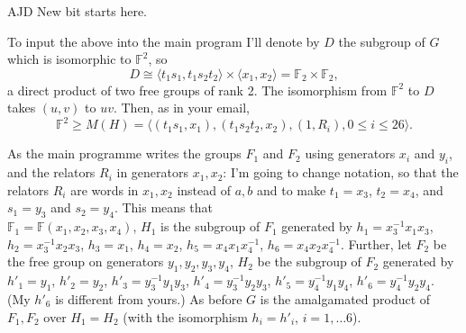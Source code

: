 \documentclass[a4paper,12pt]{article}
\numberwithin{equation}{section}
\numberwithin{figure}{section}
\newcommand{\FF}{\ensuremath{\mathbb{F}}}
\newcommand{\la}{\langle}
\newcommand{\ra}{\rangle}
\newenvironment{ajd1}{\noindent\color{red} AJD }{}
\newcommand{\ajd}[1]{\begin{ajd1} #1 \end{ajd1}}
\begin{document}
\ajd{New bit starts here.\\} 

To input the above into the main program I'll denote by $D$ 
the subgroup of $G$ which is isomorphic to  
$\FF^2$, so 
\[D\cong \la t_1s_1,t_1s_2t_2\ra\times \la x_1,x_2\ra=\FF_2\times \FF_2,\]
a direct product of two free groups of rank 2. The isomorphism from
$\FF^2$ to $D$ takes $(u,v)$ to $uv$. Then, as in your email, 
\[\FF^2\ge M(H)=\la (t_1s_1,x_1), (t_1s_2t_2,x_2), (1,R_i), 0\le i \le 26\ra.\]


As the main programme writes the groups $F_1$ and $F_2$ using generators 
$x_i$ and $y_i$, and the relators $R_i$ in generators $x_1,x_2$: 
 I'm going to change notation, so that 
the relators $R_i$ are words in $x_1,x_2$ instead of $a, b$ and to make 
$t_1=x_3$, $t_2=x_4$, and  
 $s_1=y_3$ and $s_2=y_4$. This means
that \\
$\FF_1= \FF(x_1,x_2,x_3, x_4)$,
$H_1$ is the subgroup of $F_1$ generated by 
$h_1= x_3^{-1} x_1 x_3$, 
$h_2 = x_3^{-1} x_2 x_3$, 
$h_3 =x_1$, 
$h_4 = x_2$,
$h_5= x_4 x_1 x_4^{-1}$, 
$h_6 = x_4 x_2 x_4^{-1}$.
Further, let $F_2$ be the free group on generators $y_1, y_2, y_3, y_4$,
$H_2$ be the subgroup of $F_2$ generated by 
$h'_1= y_1$, 
$h'_2 = y_2$, 
$h'_3 = y_3^{-1} y_1 y_3 $, 
$h'_4 = y_3^{-1} y_2 y_3$,
$h'_5= y_4^{-1} y_1 y_4$, 
$h'_6 = y_4^{-1} y_2 y_4$.
(My $h'_6$ is different from yours.)
As before $G$ is the amalgamated product  of $F_1, F_2$ over $H_1=H_2$ (with the isomorphism $h_i = h'_i$, $i = 1,\ldots 6$).
\end{document}
